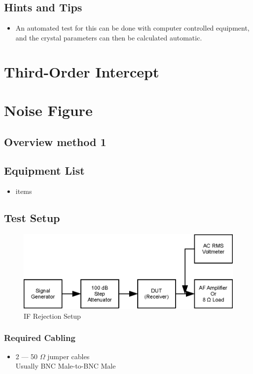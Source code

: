 \documentclass[10pt,letterpaper]{book}
\begin{document}
\subsection*{Hints and Tips}
\begin{itemize}
\item An automated test for this can be done with computer controlled equipment, and the crystal parameters can then be calculated automatic.
\end{itemize}





\section{Third-Order Intercept}
\section{Noise Figure}
\subsection*{Overview method 1}
\subsection*{Equipment List}
\begin{itemize}
	\item items
\end{itemize}
\subsection*{Test Setup}
\begin{figure}
\centering
\includegraphics[scale=1]{Illustrations/MDSSetup}
\caption{IF Rejection Setup}
\end{figure}
\subsubsection*{Required Cabling}
\begin{itemize}
	\item 2 --- 50 $\Omega$ jumper cables \\
		Usually BNC Male-to-BNC Male
\end{itemize}
\end{document}
